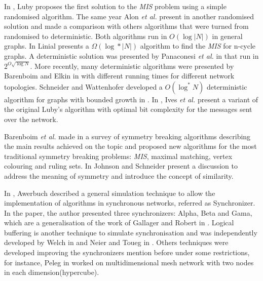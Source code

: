 In \cite{luby1986simple}, Luby proposes the first solution to the \textit{MIS} problem using a simple randomised algorithm. The same year Alon \textit{et al.} present in \cite{alon1986fast} another randomised solution and made a comparison with others algorithms that were turned from randomised to deterministic. Both algorithms run in $O(\log |N|)$ in general graphs. In \cite{linial1992locality} Linial presents a $\Omega(\log* |N|)$ algorithm to find the \textit{MIS} for n-cycle graphs. A deterministic solution was presented by Panaconesi \textit{et al.} in \cite{panconesi1996complexity} that run in $2^{O\sqrt{\log N}}$. More recently, many deterministic algorithms were presented by Barenboim and Elkin in \cite{barenboim2010sublogarithmic} with different running times for different network topologies. Schneider and Wattenhofer developed a $O(\log^* N)$ deterministic algorithm for graphs with bounded growth in \cite{barenboim2010sublogarithmic}. In \cite{yves2009optimal}, Ives \textit{et al.} present a variant of the original Luby's algorithm with optimal bit complexity for the messages sent over the network. 

 Barenboim \textit{et al.} made in \cite{barenboim2016locality} a survey of symmetry breaking algorithms describing the main results achieved on the topic and proposed new algorithms for the most traditional symmetry breaking problems: \textit{MIS}, maximal matching, vertex colouring and ruling sets. In \cite{johnson1985symmetry} Johnson and Schneider present a discussion to address the meaning of symmetry and introduce the concept of similarity.
 
In \cite{awerbuch1985complexity}, Awerbuch described a general simulation technique to allow the implementation of algorithms in synchronous networks, referred as Synchronizer. In the paper, the author presented three synchronizers: Alpha, Beta and Gama, which are a generalisation of the work of Gallager and Robert in \cite{gallager1982distributed}. Logical buffering is another technique to simulate synchronisation and was independently developed by Welch in \cite{welch1987simulating} and Neier and Toueg in \cite{neiger1993simulating}. Others techniques were developed improving the synchronizers mention before under some restrictions, for instance, Peleg in \cite{peleg1989optimal} worked on multidimensional mesh network with two nodes in each dimension(hypercube).